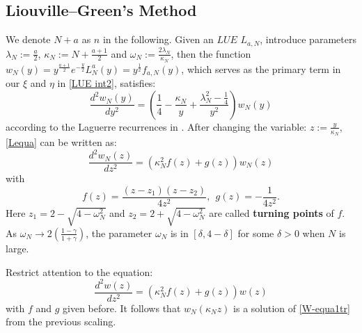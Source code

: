 \documentclass[11pt]{article}
\numberwithin{equation}{section}%
\numberwithin{theorem}{section}
\begin{document}
\subsection{Liouville--Green's Method}\label{sec: L-G method}
We denote $N+a$ as $n$ in the following. Given an $LUE$ $L_{a,N}$, introduce parameters $\lambda_N:=\frac{a}{2}$, $\kappa_N:=N+\frac{a+1}{2}$ and $\omega_N:=\frac{2\lambda_N}{\kappa_N}$, then the function $w_N(y)=y^{\frac{a+1}{2}}e^{-\frac{y}{2}}L^a_N(y)=y^\frac{1}{2}f_{a,N}(y)$, which serves as the primary term in our $\xi$ and $\eta$ in \eqref{LUE int2}, satisfies:
\begin{equation}\label{Lequa}
    \frac{d^2w_N(y)}{dy^2}=\left(\frac{1}{4}-\frac{\kappa_N}{y}+\frac{\lambda_N^2-\frac{1}{4}}{y^2}\right)w_N(y)
\end{equation}
according to the Laguerre recurrences in \cite[Chapter $5.1$]{szego1975orthogonal}. After changing the variable: $z:=\frac{y}{\kappa_N}$, \eqref{Lequa} can be written as:
\begin{equation}\label{W-equa1}
    \frac{d^2w_N(z)}{dz^2}=\left(\kappa_N^2f(z)+g(z)\right)w_N(z)
\end{equation}
with
\begin{equation*}
    f(z)=\frac{(z-z_1)(z-z_2)}{4z^2},~~g(z)=-\frac{1}{4z^2}.
\end{equation*}
Here $z_1=2-\sqrt{4-\omega_N^2}$ and $z_2=2+\sqrt{4-\omega_N^2}$ are called \textbf{turning points} of $f$. As $\omega_N\rightarrow2\left(\frac{1-\gamma}{1+\gamma}\right)$, the parameter $\omega_N$ is in $[\delta,4-\delta]$ for some $\delta>0$ when $N$ is large.

Restrict attention to the equation:
\begin{equation}\label{W-equa1tr}
    \frac{d^2w(z)}{dz^2}=\left(\kappa_N^2f(z)+g(z)\right)w(z)
\end{equation}
with $f$ and $g$ given before. It follows that $w_N(\kappa_Nz)$ is a solution of \eqref{W-equa1tr} from the previous scaling.
\end{document}
